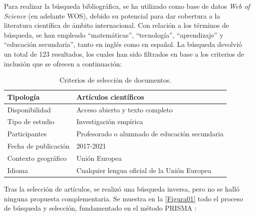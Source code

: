 \documentclass[spanish]{textolivre}
\begin{document}
Para realizar la búsqueda bibliográfica, se ha utilizado como base de datos \textit{Web of Science} (en adelante WOS), debido su potencial para dar cobertura a la literatura científica de ámbito internacional. Con relación a los términos de búsqueda, se han empleado “matemáticas”, “tecnología”, “aprendizaje” y “educación secundaria”, tanto en inglés como en español. La búsqueda devolvió un total de 123 resultados, los cuales han sido filtrados en base a los criterios de inclusión que se ofrecen a continuación:

\begin{table}[h!]
\centering
\begin{threeparttable}
\caption{Criterios de selección de documentos.}
\begin{tabular}{ll}
\toprule
Tipología & Artículos científicos \\
\midrule
Disponibilidad & Acceso abierto y texto completo \\
Tipo de estudio & Investigación empírica \\
Participantes & Profesorado o alumnado de educación secundaria \\
Fecha de publicación & 2017-2021 \\
Contexto geográfico & Unión Europea \\
Idioma & Cualquier lengua oficial de la Unión Europea \\
\bottomrule
\end{tabular}
\label{Tabla01}
\end{threeparttable}
\end{table} 

Tras la selección de artículos, se realizó una búsqueda inversa, pero no se halló ninguna propuesta complementaria. Se muestra en la \cref{Figura01} todo el proceso de búsqueda y selección, fundamentado en el método PRISMA \cite{urrutia_declaracion_2010}:
\end{document}
